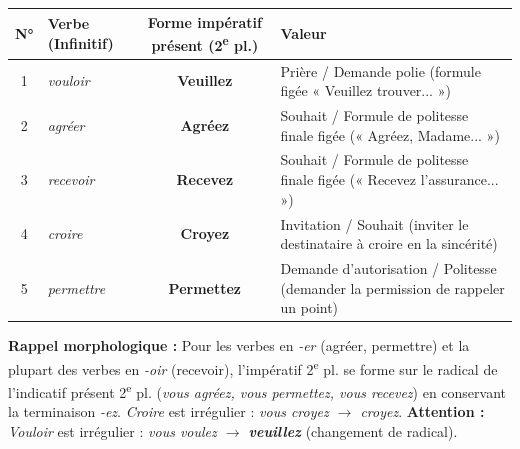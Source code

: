\documentclass[11pt]{article}
\newcommand{\cle}[1]{{\popxbold\color{popdark}#1}}
\begin{document}
\begin{corrige}
\begin{center}
\begin{tabularx}{\linewidth}{|c|X|c|X|}\hline
\textbf{N°} & \textbf{Verbe (Infinitif)} & \textbf{Forme impératif présent (2\textsuperscript{e} pl.)} & \textbf{Valeur} \\ \hline
1 & \emph{vouloir} & \textbf{Veuillez} & \cle{Prière} / Demande polie (formule figée « Veuillez trouver... ») \\ \hline
2 & \emph{agréer} & \textbf{Agréez} & \cle{Souhait} / Formule de politesse finale figée (« Agréez, Madame... ») \\ \hline
3 & \emph{recevoir} & \textbf{Recevez} & \cle{Souhait} / Formule de politesse finale figée (« Recevez l'assurance... ») \\ \hline
4 & \emph{croire} & \textbf{Croyez} & \cle{Invitation} / \cle{Souhait} (inviter le destinataire à croire en la sincérité) \\ \hline
5 & \emph{permettre} & \textbf{Permettez} & \cle{Demande d'autorisation} / Politesse (demander la permission de rappeler un point) \\ \hline
\end{tabularx}
\end{center}
\textbf{Rappel morphologique :} Pour les verbes en \emph{-er} (agréer, permettre) et la plupart des verbes en \emph{-oir} (recevoir), l'impératif 2\textsuperscript{e} pl. se forme sur le radical de l'indicatif présent 2\textsuperscript{e} pl. (\emph{vous agréez, vous permettez, vous recevez}) en conservant la terminaison \emph{-ez}. \emph{Croire} est irrégulier : \emph{vous croyez $\rightarrow$ croyez}. \textbf{Attention :} \emph{Vouloir} est irrégulier : \emph{vous voulez $\rightarrow$ \textbf{veuillez}} (changement de radical).
\end{corrige}
\end{document}

